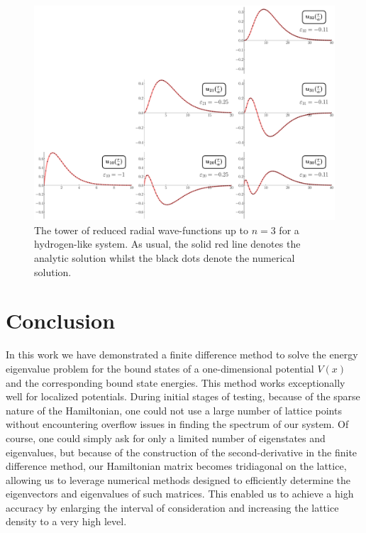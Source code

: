 \begin{figure}[h!tb]
    \centering
    \includegraphics[width=\linewidth]{hydrogen_wfs.pdf}
    \caption{The tower of reduced radial wave-functions up to $n = 3$ for a hydrogen-like system. As usual, the solid red line denotes the analytic solution whilst the black dots denote the numerical solution.}
    \label{fig:hydrogen-wfs}
\end{figure}



\section{Conclusion}
\label{sec:conclusion}

In this work we have demonstrated a finite difference method to solve the energy eigenvalue problem for the bound states of a one-dimensional potential $V(x)$ and the corresponding bound state energies.
This method works exceptionally well for localized potentials.
During initial stages of testing, because of the sparse nature of the Hamiltonian, one could not use a large number of lattice points without encountering overflow issues in finding the spectrum of our system.
Of course, one could simply ask for only a limited number of eigenstates and eigenvalues, but because of the construction of the second-derivative in the finite difference method, our Hamiltonian matrix becomes tridiagonal on the lattice, allowing us to leverage numerical methods designed to efficiently determine the eigenvectors and eigenvalues of such matrices.
This enabled us to achieve a high accuracy by enlarging the interval of consideration and increasing the lattice density to a very high level.


